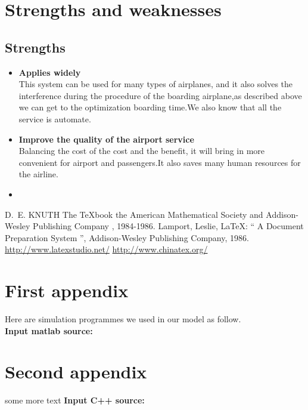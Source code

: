 \documentclass{mcmthesis}
\begin{document}
\section{Strengths and weaknesses}
\lipsum[12]

\subsection{Strengths}
\begin{itemize}
\item \textbf{Applies widely}\\
This  system can be used for many types of airplanes, and it also
solves the interference during  the procedure of the boarding
airplane,as described above we can get to the  optimization
boarding time.We also know that all the service is automate.
\item \textbf{Improve the quality of the airport service}\\
Balancing the cost of the cost and the benefit, it will bring in
more convenient  for airport and passengers.It also saves many
human resources for the airline. \item \textbf{}
\end{itemize}

\begin{thebibliography}{99}
 D.~E. KNUTH   The \TeX{}book  the American
Mathematical Society and Addison-Wesley
Publishing Company , 1984-1986.
Lamport, Leslie,  \LaTeX{}: `` A Document Preparation System '',
Addison-Wesley Publishing Company, 1986.
\url{http://www.latexstudio.net/}
\url{http://www.chinatex.org/}
\end{thebibliography}

\begin{appendices}

\section{First appendix}

\lipsum[13]

Here are simulation programmes we used in our model as follow.\\

\textbf{\textcolor[rgb]{0.98,0.00,0.00}{Input matlab source:}}


\section{Second appendix}

some more text \textcolor[rgb]{0.98,0.00,0.00}{\textbf{Input C++ source:}}


\end{appendices}
\end{document}
